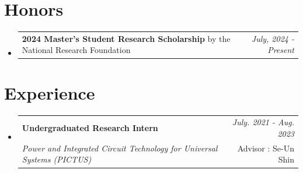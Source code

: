 \documentclass[a4paper,11pt]{article}
\makeatletter
\newcommand{\resumePOR}[3]{
\vspace{0.5mm}\item
    \begin{tabular*}{0.97\textwidth}[t]{l@{\extracolsep{\fill}}r}
        \textbf{#1}\hspace{0.3mm}#2 & \textit{\small{#3}} 
    \end{tabular*}
    \vspace{-2mm}
}
\newcommand{\resumeSubheading}[4]{
\vspace{0.5mm}\item
    \begin{tabular*}{0.98\textwidth}[t]{l@{\extracolsep{\fill}}r}
        \textbf{#1} & \textit{\footnotesize{#4}} \\
        \textit{\footnotesize{#3}} &  \footnotesize{#2}\\
    \end{tabular*}
    \vspace{-2.4mm}
}
\newcommand{\resumeSubHeadingListStart}{\begin{itemize}[leftmargin=*,labelsep=0mm]}
\newcommand{\resumeItemListStart}{\begin{justify}\begin{itemize}[leftmargin=3ex, rightmargin=2ex, noitemsep,labelsep=1.2mm,itemsep=0mm]\small}
\newcommand{\resumeSubHeadingListEnd}{\end{itemize}\vspace{2mm}}
\newcommand{\resumeItemListEnd}{\end{itemize}\end{justify}\vspace{-2mm}}
\makeatother
\begin{document}
    

\section{\textbf{Honors}} %
\vspace{-0.4mm}
\resumeSubHeadingListStart

\resumePOR{ 2024 Master's Student Research Scholarship } %
    {by the National Research Foundation} %
    {July, 2024 - Present} %

\resumeSubHeadingListEnd
\vspace{-5mm}
\setlength{\footskip}{4.08003pt}

\section{\textbf{Experience}}
  \resumeSubHeadingListStart
    \resumeSubheading
      { Undergraduated Research Intern}{Advisor : Se-Un Shin}
      {Power and Integrated Circuit Technology for Universal Systems (PICTUS)}{July. 2021 - Aug. 2023}
      \vspace{-2.0mm}
      \resumeItemListStart
    \resumeItemListEnd
    
    \vspace{-3.0mm}
    
      
  \resumeSubHeadingListEnd
\vspace{-5mm}
\end{document}
